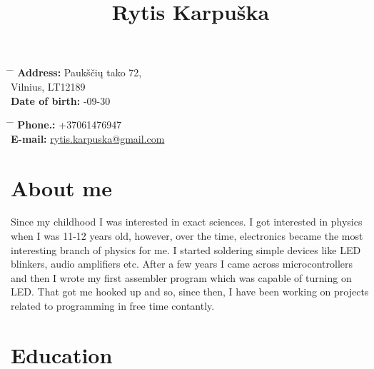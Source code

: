 \documentclass[12]{article}
\begin{document}
\title{Rytis Karpuška}


\parbox{0.5\textwidth}{ %
\begin{tabbing} %
\hspace{3cm} \= \hspace{4cm} \= \kill %
{\bf Address:} \> Paukščių tako 72,\\ %
\> Vilnius, LT12189\\ %
{\bf Date of birth:} -09-30\\ %
\end{tabbing}}
\hfill %
\parbox{0.5\textwidth}{ %
\begin{tabbing} %
\hspace{3cm} \= \hspace{4cm} \= \kill %
{\bf Phone.:} \> +37061476947 \\ %
{\bf E-mail:} \> \href{mailto:rytis.karpuska@gmail.com}{rytis.karpuska@gmail.com} \\ %
\end{tabbing}}

\section{About me}

Since my childhood I was interested in exact sciences.
I got interested  in physics when I was 11-12 years old, however, over the time, electronics became the most interesting branch of physics for me.
I started soldering simple devices like LED blinkers, audio amplifiers etc.
After a few years I came across microcontrollers and then I wrote my first assembler program which was capable of turning on LED.
That got me hooked up and so, since then, I have been working on projects related to programming in free time contantly.

\section{Education}

\end{document}
